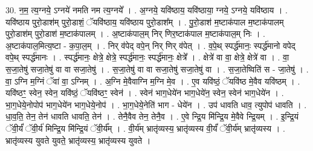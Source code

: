 \documentclass[17pt]{extarticle}
\begin{document}
30. न॒म॒ त्य॒ग्नये॒ ऽग्नये॑ नमति नम त्य॒ग्नये᳚ । . अ॒ग्नये॒ यवि॑ष्ठाय॒ यवि॑ष्ठाया॒ ग्नये॒ ऽग्नये॒ यवि॑ष्ठाय । . यवि॑ष्ठाय पुरो॒डाश॑म् पुरो॒डाशं॒ ॅयवि॑ष्ठाय॒ यवि॑ष्ठाय पुरो॒डाश᳚म् । . पु॒रो॒डाश॑ म॒ष्टाक॑पाल म॒ष्टाक॑पालम् पुरो॒डाश॑म् पुरो॒डाश॑ म॒ष्टाक॑पालम् । . अ॒ष्टाक॑पाल॒म् निर् णिर॒ष्टाक॑पाल म॒ष्टाक॑पाल॒म् निः । . अ॒ष्टाक॑पाल॒मित्य॒ष्टा - क॒पा॒ल॒म् । . निर् व॑पेद् वपे॒न् निर् णिर् व॑पेत् । . व॒पे॒थ् स्पर्द्ध॑मानः॒ स्पर्द्ध॑मानो वपेद् वपे॒थ् स्पर्द्ध॑मानः । . स्पर्द्ध॑मानः॒ क्षेत्रे॒ क्षेत्रे॒ स्पर्द्ध॑मानः॒ स्पर्द्ध॑मानः॒ क्षेत्रे᳚ । . क्षेत्रे॑ वा वा॒ क्षेत्रे॒ क्षेत्रे॑ वा । . वा॒ स॒जा॒तेषु॑ सजा॒तेषु॑ वा वा सजा॒तेषु॑ । . स॒जा॒तेषु॑ वा वा सजा॒तेषु॑ सजा॒तेषु॑ वा । . स॒जा॒तेष्विति॑ स - जा॒तेषु॑ । . वा॒ ऽग्नि म॒ग्निं ॅवा॑ वा॒ ऽग्निम् । . अ॒ग्नि मे॒वैवाग्नि म॒ग्नि मे॒व । . ए॒व यवि॑ष्ठं॒ ॅयवि॑ष्ठ मे॒वैव यवि॑ष्ठम् । . यवि॑ष्ठꣳ॒॒ स्वेन॒ स्वेन॒ यवि॑ष्ठं॒ ॅयवि॑ष्ठꣳ॒॒ स्वेन॑ । . स्वेन॑ भाग॒धेये॑न भाग॒धेये॑न॒ स्वेन॒ स्वेन॑ भाग॒धेये॑न । . भा॒ग॒धेये॒नोपोप॑ भाग॒धेये॑न भाग॒धेये॒नोप॑ । . भा॒ग॒धेये॒नेति॑ भाग - धेये॑न । . उप॑ धावति धाव॒ त्युपोप॑ धावति । . धा॒व॒ति॒ तेन॒ तेन॑ धावति धावति॒ तेन॑ । . तेनै॒वैव तेन॒ तेनै॒व । . ए॒वे न्द्रि॒य मि॑न्द्रि॒य मे॒वैवे न्द्रि॒यम् । . इ॒न्द्रि॒यं ॅवी॒र्यं॑ ॅवी॒र्य॑ मिन्द्रि॒य मि॑न्द्रि॒यं ॅवी॒र्य᳚म् । . वी॒र्य॑म् भ्रातृ॑व्यस्य॒ भ्रातृ॑व्यस्य वी॒र्यं॑ ॅवी॒र्य॑म् भ्रातृ॑व्यस्य । . भ्रातृ॑व्यस्य युवते युवते॒ भ्रातृ॑व्यस्य॒ भ्रातृ॑व्यस्य युवते । \newline
\end{document}
